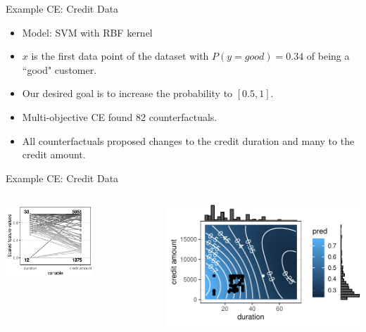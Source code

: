 \documentclass[aspectratio=169]{../latex_main/tntbeamer}  %
\begin{document}
\begin{frame}[c]{Example CE: Credit Data}
	\begin{itemize}
		\item Model: SVM with RBF kernel
		\item $x$ is the first data point of the dataset with $P(y = good)  = 0.34$ of being a ``good" customer.  
		\item Our desired goal is to increase the probability to $[0.5, 1]$.
		\item Multi-objective CE found 82 counterfactuals.
		\item All counterfactuals proposed changes to the credit duration and many to the credit amount.  
	\end{itemize}
	
\end{frame}
\begin{frame}{Example CE: Credit Data}
    \vspace{-2em}
	\begin{columns}
				\begin{column}{0.5\textwidth}  
			\begin{center}
				\includegraphics[width=0.6\textwidth]{figure/counterfactuals_credit_parallel}
			\end{center}
			
		\end{column}
		\begin{column}{0.5\textwidth}
			\begin{center}
				\includegraphics[width=.8\textwidth]{figure/counterfactuals_credit_heat}
			\end{center}
				

\end{column}
\end{columns}
\end{frame}
\end{document}
